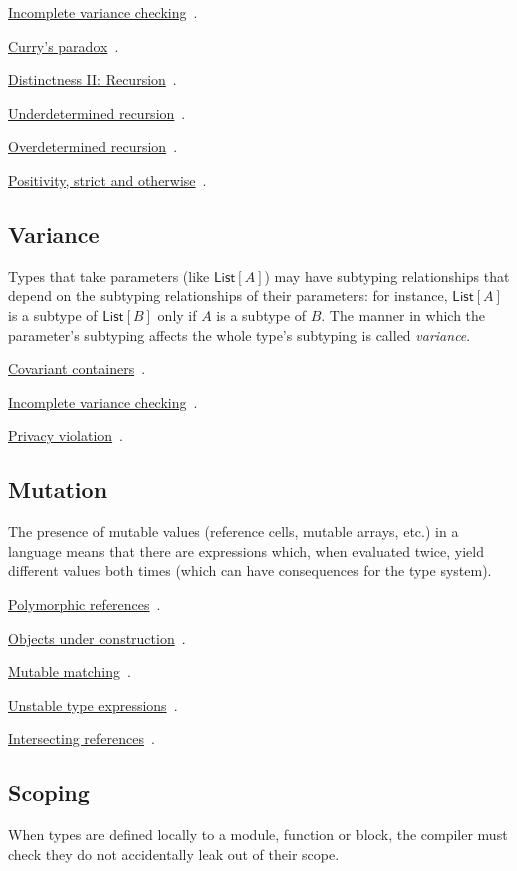 \documentclass[11pt,oneside]{article}
\newenvironment{indexlist}
  {\par\vspace{0.3\baselineskip}\begingroup
   \setlength{\parindent}{0pt}\setlength{\parskip}{1pt}\small}
  {\endgroup\par\vspace{0.2\baselineskip}}
\newcommand{\indexitem}[2]{%
  \makebox[1.2em]{}\hyperref[#1]{#2}%
  \nobreak\hspace{0.4em}\textcolor{sageline}{\leaders\hbox{\,.\,}\hfill}%
  \hspace{0.4em}\nobreak\textcolor{stone}{\pageref{#1}}\par}
\begin{document}
\begin{indexlist}
\indexitem{ce:incomplete-variance}{Incomplete variance checking}
\indexitem{ce:currys-paradox}{Curry's paradox}
\indexitem{ce:distinctness-recursion}{Distinctness II: Recursion}
\indexitem{ce:underdetermined-recursion}{Underdetermined recursion}
\indexitem{ce:overdetermined-recursion}{Overdetermined recursion}
\indexitem{ce:strict-positivity}{Positivity, strict and otherwise}
\end{indexlist}

\subsection*{Variance}\label{gloss:variance}
Types that take parameters (like \(\mathsf{List}[A]\)) may have subtyping relationships that depend on the subtyping relationships of their parameters: for instance, \(\mathsf{List}[A]\) is a subtype of \(\mathsf{List}[B]\) only if \(A\) is a subtype of \(B\). The manner in which the parameter's subtyping affects the whole type's subtyping is called \emph{variance}.

\begin{indexlist}
\indexitem{ce:general-covariance}{Covariant containers}
\indexitem{ce:incomplete-variance}{Incomplete variance checking}
\indexitem{ce:privacy-violation}{Privacy violation}
\end{indexlist}

\subsection*{Mutation}\label{gloss:mutation}
The presence of mutable values (reference cells, mutable arrays, etc.) in a language means that there are expressions which, when evaluated twice, yield different values both times (which can have consequences for the type system).

\begin{indexlist}
\indexitem{ce:polymorphic-references}{Polymorphic references}
\indexitem{ce:under-construction}{Objects under construction}
\indexitem{ce:mutable-matching}{Mutable matching}
\indexitem{ce:unstable-types}{Unstable type expressions}
\indexitem{ce:intersecting-references}{Intersecting references}
\end{indexlist}

\subsection*{Scoping}\label{gloss:scoping}
When types are defined locally to a module, function or block, the compiler must check they do not accidentally leak out of their scope.
\end{document}
